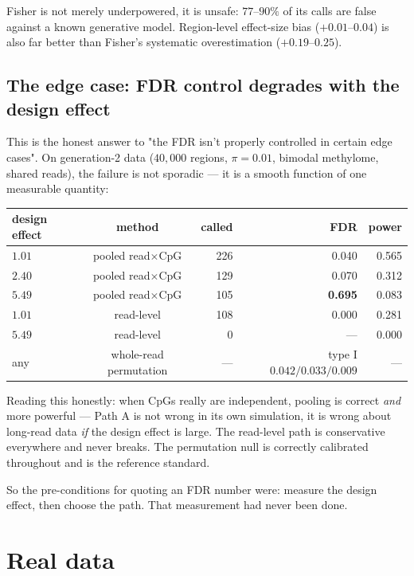 \documentclass[11pt]{article}
\begin{document}
Fisher is not merely underpowered, it is unsafe: $77$--$90\%$ of its calls are
false against a known generative model. Region-level effect-size bias
($+0.01$--$0.04$) is also far better than Fisher's systematic overestimation
($+0.19$--$0.25$).

\subsection{The edge case: FDR control degrades with the design effect}

This is the honest answer to "the FDR isn't properly controlled in certain edge
cases". On generation-2 data ($40{,}000$ regions, $\pi = 0.01$, bimodal
methylome, shared reads), the failure is not sporadic --- it is a smooth function
of one measurable quantity:

\begin{center}
\small
\begin{tabular}{lcrrr}
\toprule
design effect & method & called & FDR & power \\
\midrule
$1.01$ & pooled read$\times$CpG & 226 & 0.040 & 0.565 \\
$2.40$ & pooled read$\times$CpG & 129 & 0.070 & 0.312 \\
$5.49$ & pooled read$\times$CpG & 105 & \textbf{0.695} & 0.083 \\
\midrule
$1.01$ & read-level & 108 & 0.000 & 0.281 \\
$5.49$ & read-level & 0 & --- & 0.000 \\
\midrule
any & whole-read permutation & --- & type I $0.042/0.033/0.009$ & --- \\
\bottomrule
\end{tabular}
\end{center}

Reading this honestly: when CpGs really are independent, pooling is correct
\emph{and} more powerful --- Path A is not wrong in its own simulation, it is
wrong about long-read data \emph{if} the design effect is large. The read-level
path is conservative everywhere and never breaks. The permutation null is
correctly calibrated throughout and is the reference standard.

So the pre-conditions for quoting an FDR number were: measure the design effect,
then choose the path. That measurement had never been done.

\section{Real data}
\label{sec:real}
\end{document}
